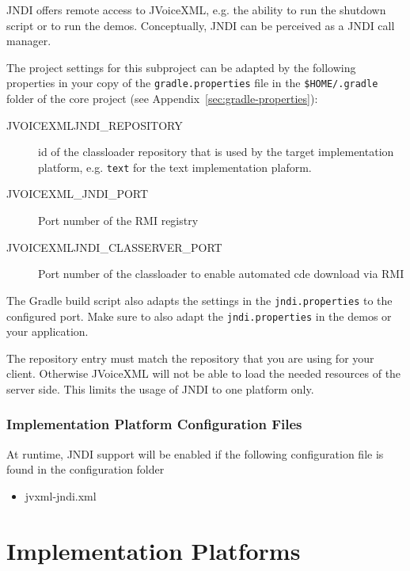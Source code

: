\documentclass[11pt,a4paper]{article}
\begin{document}
JNDI offers remote access to JVoiceXML, e.g. the ability to run the
shutdown script or to run the demos. Conceptually, JNDI can be perceived as a JNDI
call manager. 

The project settings for this subproject can be adapted by the following 
properties in your copy of the \texttt{gradle.properties} file in the
\texttt{\${HOME}/.gradle} folder of the core project (see 
Appendix~\ref{sec:gradle-properties}):
\begin{description}
\item[JVOICEXMLJNDI\_REPOSITORY] id of the classloader repository that is used by the target implementation platform, e.g.
\texttt{text} for the text implementation plaform. 
\item[JVOICEXML\_JNDI\_PORT] Port number of the RMI registry
\item[JVOICEXMLJNDI\_CLASSERVER\_PORT] Port number of the classloader to enable automated cde download via RMI
\end{description}

The Gradle build script also adapts the settings in the
\texttt{jndi.properties} to the configured port. Make sure to also adapt
the \texttt{jndi.properties} in the demos or your application.

The repository entry must match the repository that you are using for your
client. Otherwise JVoiceXML will not be able to load the needed resources of
the server side. This limits the usage of JNDI to one platform only.

\subsubsection{Implementation Platform Configuration Files}

At runtime, JNDI support will be enabled if the following configuration file is found in the configuration
folder
\begin{itemize}
\item jvxml-jndi.xml
\end{itemize}

\section{Implementation Platforms}
\label{sec:implementation-platforms}
\end{document}
